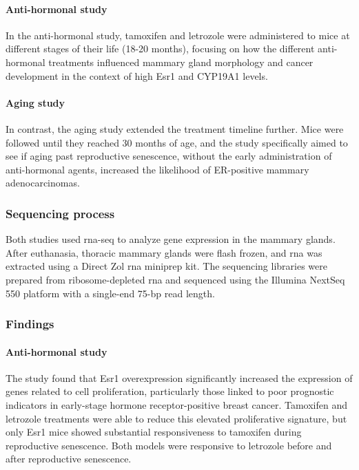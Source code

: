 \paragraph{Anti-hormonal study}
In the anti-hormonal study, tamoxifen and letrozole were administered to mice
at different stages of their life (18-20 months), focusing on how the different
anti-hormonal treatments influenced mammary gland morphology and cancer
development in the context of high Esr1 and CYP19A1
levels\supercite{furth_esr1_2023}.

\paragraph{Aging study}
In contrast, the aging study extended the treatment timeline further.
Mice were followed until they reached 30 months of age, and the study
specifically aimed to see if aging past reproductive senescence, without the
early administration of anti-hormonal agents, increased the likelihood of
ER-positive mammary adenocarcinomas\supercite{furth_overexpression_2023}.

\subsubsection{Sequencing process}
\label{sec:dataset_sequencing}
Both studies used \gls{rna-seq} to analyze gene expression in the mammary
glands.
After euthanasia, thoracic mammary glands were flash frozen, and \gls{rna} was
extracted using a Direct Zol \gls{rna} miniprep kit.
The sequencing libraries were prepared from ribosome-depleted \gls{rna} and
sequenced using the Illumina NextSeq 550 platform with a single-end 75-bp read
length\supercite{furth_esr1_2023,furth_overexpression_2023}.

\subsubsection{Findings}

\paragraph{Anti-hormonal study}
The study found that Esr1 overexpression significantly increased the expression
of genes related to cell proliferation, particularly those linked to poor
prognostic indicators in early-stage hormone receptor-positive breast cancer.
Tamoxifen and letrozole treatments were able to reduce this elevated
proliferative signature, but only Esr1 mice showed substantial responsiveness
to tamoxifen during reproductive senescence.
Both models were responsive to letrozole before and after reproductive
senescence\supercite{furth_esr1_2023}.

